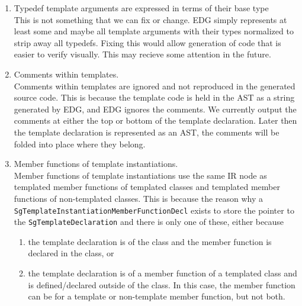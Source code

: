 \begin{enumerate}
     \item Typedef template arguments are expressed in terms of their base type \\
     This is not something that we can fix or change. EDG simply represents 
     at least some and maybe all template arguments with their types normalized 
     to strip away all typedefs.  Fixing this would allow 
     generation of code that is easier to verify visually.  This may recieve 
     some attention in the future.

     \item Comments within templates. \\
     Comments within templates are ignored and not reproduced in the generated
     source code.  This is because the template code is held in the AST as a string
     generated by EDG, and EDG ignores the comments.  We currently output the comments 
     at either the top or bottom of the template declaration.  Later then the template
     declaration is represented as an AST, the comments will be folded into place where
     they belong.

     \item Member functions of template instantiations. \\
     Member functions of template instantiations use the same IR node as 
     templated member functions of templated classes and templated member functions of
     non-templated classes.  This is because the reason why a 
     {\tt SgTemplateInstantiationMemberFunctionDecl} exists to store the pointer to the 
     {\tt SgTemplateDeclaration} and there is only one of these, either because
     \begin{enumerate}
       \item the template declaration is of the class and the member function is declared in
          the class, or
       \item the template declaration is of a member function of a templated class and is
          defined/declared outside of the class.  In this case, the member function can 
          be for a template or non-template member function, but not both.
     \end{enumerate}



\end{enumerate}
